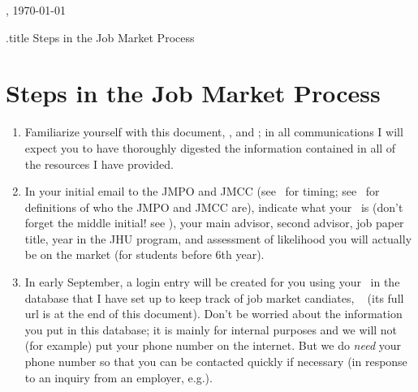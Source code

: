 \documentclass{\classes/econtex}
\begin{document}
\hfill{\tiny \jobname, \today} \vspace{0.1in}

\begin{verbatimwrite}{\jobname.title}
  Steps in the Job Market Process
\end{verbatimwrite}

\section*{\Large Steps in the Job Market Process}\medskip\medskip

\begin{enumerate}
\item Familiarize yourself with this document, \timet, and \faq; in all communications I will expect you
  to have thoroughly digested the information contained in all of the resources
  I have provided.

\item In your initial email to the JMPO and JMCC (see \timet~for timing; see \ntn~for definitions of who the JMPO and JMCC are), indicate what your \Moniker~is (don't forget the middle initial!  see \Notation), your main advisor, second advisor, job paper title,
  year in the JHU program, and assessment of likelihood you will
  actually be on the market (for students before 6th year).

  \hypertarget{jhueconpeople-data}{}
\item {} In early September, a login entry will be created for you using your \Moniker~in the database that I have set up to keep track of job market candiates, \db~ (its full url is at the end of this document).  Don't be worried about the information you put in this database; it is mainly for internal purposes and we will not (for example) put your phone number on the internet.  But we do \textit{need} your phone number so that you can be contacted quickly if necessary (in response to an inquiry from an employer, e.g.).


\end{enumerate}
\end{document}
